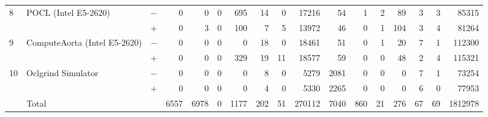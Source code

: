 \begin{tabular}{lll | rrrrrrr | rrrrrrr }
\hline
\multirow{ 2}{*}{8} & \multirow{ 2}{*}{POCL (Intel E5-2620)} & $-$ & 0 & 0 & 0 & 695 & 14 & 0 & 17216       & 54 & 1 & 2 & 89 & 3 & 3 & 85315 \\& & $+$ & 0 & 3 & 0 & 100 & 7 & 5 & 13972 & 46 & 0 & 1 & 104 & 3 & 4 & 81264 \\
\hline
\multirow{ 2}{*}{9} & \multirow{ 2}{*}{ComputeAorta (Intel E5-2620)} & $-$ & 0 & 0 & 0 & 0 & 18 & 0 & 18461       & 51 & 0 & 1 & 20 & 7 & 1 & 112300 \\& & $+$ & 0 & 0 & 0 & 329 & 19 & 11 & 18577 & 59 & 0 & 0 & 48 & 2 & 4 & 115321 \\
\hline
\multirow{ 2}{*}{10} & \multirow{ 2}{*}{Oclgrind Simulator} & $-$ & 0 & 0 & 0 & 0 & 8 & 0 & 5279       & 2081 & 0 & 0 & 0 & 7 & 1 & 73254 \\& & $+$ & 0 & 0 & 0 & 0 & 4 & 0 & 5330 & 2265 & 0 & 0 & 0 & 6 & 0 & 77953 \\
  \midrule
  
\multirow{ 2}{*}{} & \multirow{ 2}{*}{Total} & \multirow{ 2}{*}{} &
\multirow{ 2}{*}{6557} & \multirow{ 2}{*}{6978} & \multirow{ 2}{*}{0} & \multirow{ 2}{*}{1177} & \multirow{ 2}{*}{202} & \multirow{ 2}{*}{51} & \multirow{ 2}{*}{270112} & \multirow{ 2}{*}{7040} & \multirow{ 2}{*}{860} & \multirow{ 2}{*}{21} & \multirow{ 2}{*}{276} & \multirow{ 2}{*}{67} & \multirow{ 2}{*}{69} & \multirow{ 2}{*}{1812978} \\
\\

  \bottomrule
\end{tabular}

